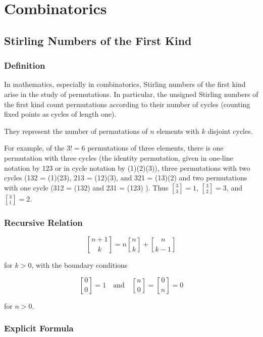 \documentclass[10pt]{article}
\newcommand{\stirlingi}{\genfrac{[}{]}{0pt}{}}
\begin{document}
\section{Combinatorics}

\subsection{Stirling Numbers of the First Kind}

\subsubsection{Definition}

In mathematics, especially in combinatorics, Stirling numbers of the first kind
arise in the study of permutations. In particular, the unsigned Stirling numbers
of the first kind count permutations according to their number of cycles
(counting fixed points as cycles of length one).

They represent the number of permutations of $n$ elements with $k$ disjoint
cycles.

For example, of the $3! = 6$ permutations of three elements, there is one
permutation with three cycles (the identity permutation, given in one-line
notation by 123 or in cycle notation by (1)(2)(3)), three permutations with two
cycles (132 = (1)(23), 213 = (12)(3), and 321 = (13)(2) and two permutations
with one cycle (312 = (132) and 231 = (123) ). Thus $\stirlingi{3}{3} = 1$,
$\stirlingi{3}{2} = 3$, and $\stirlingi{3}{1} = 2$.

\subsubsection{Recursive Relation}

\begin{displaymath}
\stirlingi{n + 1}{k} = n \stirlingi{n}{k} + \stirlingi{n}{k - 1}
\end{displaymath}

for $k > 0$, with the boundary conditions

\begin{displaymath}
\stirlingi{0}{0} = 1 \quad\text{and}\quad \stirlingi{n}{0} = \stirlingi{0}{n} = 0
\end{displaymath}

for $n > 0$.

\subsubsection{Explicit Formula}
\end{document}
